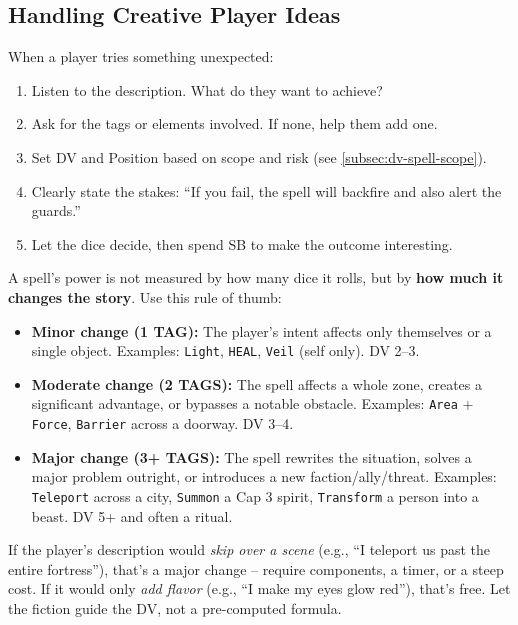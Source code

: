 \subsection*{Handling Creative Player Ideas}
When a player tries something unexpected:
\begin{enumerate}
  \item Listen to the description. What do they want to achieve?
  \item Ask for the tags or elements involved. If none, help them add one.
  \item Set DV and Position based on scope and risk (see \ref{subsec:dv-spell-scope}).
  \item Clearly state the stakes: ``If you fail, the spell will backfire and also alert the guards.''
  \item Let the dice decide, then spend SB to make the outcome interesting.
\end{enumerate}

\begin{tcolorbox}[
  colback=yellow!5,
  colframe=yellow!75!black,
  title=When in Doubt, Measure Tags by Narrative Impact,
  fonttitle=\bfseries
,breakable]
A spell's power is not measured by how many dice it rolls, but by \textbf{how much it changes the story}. Use this rule of thumb:

\begin{itemize}
  \item \textbf{Minor change (1 TAG):} The player's intent affects only themselves or a single object. Examples: \texttt{Light}, \texttt{HEAL}, \texttt{Veil} (self only). DV 2--3.
  \item \textbf{Moderate change (2 TAGS):} The spell affects a whole zone, creates a significant advantage, or bypasses a notable obstacle. Examples: \texttt{Area} + \texttt{Force}, \texttt{Barrier} across a doorway. DV 3--4.
  \item \textbf{Major change (3+ TAGS):} The spell rewrites the situation, solves a major problem outright, or introduces a new faction/ally/threat. Examples: \texttt{Teleport} across a city, \texttt{Summon} a Cap 3 spirit, \texttt{Transform} a person into a beast. DV 5+ and often a ritual.
\end{itemize}

If the player's description would \emph{skip over a scene} (e.g., ``I teleport us past the entire fortress''), that's a major change -- require components, a timer, or a steep cost. If it would only \emph{add flavor} (e.g., ``I make my eyes glow red''), that's free. Let the fiction guide the DV, not a pre-computed formula.
\end{tcolorbox}


